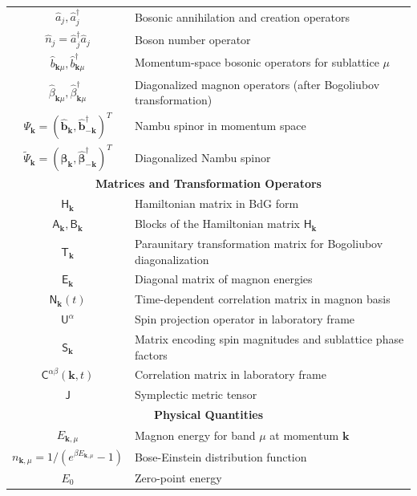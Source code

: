 \documentclass[aps, prx, nofootinbib, preprintnumbers, superscriptaddress]{revtex4-2}
\begin{document}
\begin{table}[!h]
\begin{tabular}{c|p{14cm}}
    \hline
    $\hat{a}_j, \hat{a}_j^{\dagger}$ & Bosonic annihilation and creation operators \\
    $\hat{n}_j = \hat{a}_j^{\dagger}\hat{a}_j$ & Boson number operator \\
    $\hat{b}_{\mathbf{k}\mu}, \hat{b}_{\mathbf{k}\mu}^{\dagger}$ & Momentum-space bosonic operators for sublattice $\mu$ \\
    $\hat{\beta}_{\mathbf{k}\mu}, \hat{\beta}_{\mathbf{k}\mu}^{\dagger}$ & Diagonalized magnon operators (after Bogoliubov transformation) \\
    $\Psi_{\mathbf{k}} = (\hat{\mathbf{b}}_{\mathbf{k}}, \hat{\mathbf{b}}_{-\mathbf{k}}^{\dagger})^T$ & Nambu spinor in momentum space \\
    $\widetilde{\Psi}_{\mathbf{k}} = (\hat{\boldsymbol{\beta}}_{\mathbf{k}}, \hat{\boldsymbol{\beta}}_{-\mathbf{k}}^{\dagger})^T$ & Diagonalized Nambu spinor \\
    \hline
    \multicolumn{2}{c}{\bf Matrices and Transformation Operators} \\
    \hline
    $\mathsf{H}_{\mathbf{k}}$ & Hamiltonian matrix in BdG form \\
    $\mathsf{A}_{\mathbf{k}}, \mathsf{B}_{\mathbf{k}}$ & Blocks of the Hamiltonian matrix $\mathsf{H}_{\mathbf{k}}$ \\
    $\mathsf{T}_{\mathbf{k}}$ & Paraunitary transformation matrix for Bogoliubov diagonalization \\
    $\mathsf{E}_{\mathbf{k}}$ & Diagonal matrix of magnon energies \\
    $\mathsf{N}_{\mathbf{k}}(t)$ & Time-dependent correlation matrix in magnon basis \\
    $\mathsf{U}^{\alpha}$ & Spin projection operator in laboratory frame \\
    $\mathsf{S}_{\mathbf{k}}$ & Matrix encoding spin magnitudes and sublattice phase factors \\
    $\mathsf{C}^{\alpha\beta}(\mathbf{k}, t)$ & Correlation matrix in laboratory frame \\
    $\mathsf{J}$ & Symplectic metric tensor \\
    \hline
    \multicolumn{2}{c}{\bf Physical Quantities} \\
    \hline
    $E_{\mathbf{k},\mu}$ & Magnon energy for band $\mu$ at momentum $\mathbf{k}$ \\
    $n_{\mathbf{k},\mu} = 1/(e^{\beta E_{\mathbf{k},\mu}}-1)$ & Bose-Einstein distribution function \\
    $E_0$ & Zero-point energy \\

\end{tabular}
\end{table}
\end{document}
